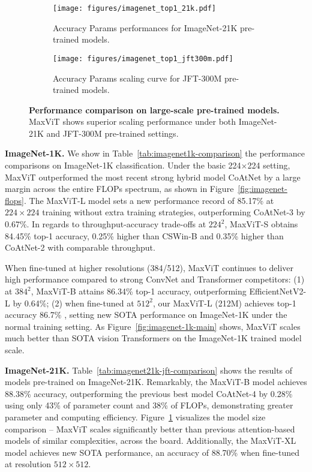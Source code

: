 \documentclass[runningheads]{llncs}
\begin{document}
\begin{figure}[!t]
 \centering
 \begin{subfigure}[b]{0.49\textwidth}
     \centering
     \texttt{[image: figures/imagenet\_top1\_21k.pdf]}
     \caption{Accuracy \vs Params performances for ImageNet-21K pre-trained models.}
     \label{fig:imagenet-21k}
 \end{subfigure}
 \hfill
 \begin{subfigure}[b]{0.49\textwidth}
     \centering
     \texttt{[image: figures/imagenet\_top1\_jft300m.pdf]}
     \caption{Accuracy \vs Params scaling curve for JFT-300M pre-trained models.}
     \label{fig:jft}
 \end{subfigure}
\caption{\textbf{Performance comparison on large-scale pre-trained models.} MaxViT shows superior scaling performance under both ImageNet-21K and JFT-300M pre-trained settings.}
\label{fig:large-scale-data-pt}
\end{figure}


\noindent\textbf{ImageNet-1K.} We show in Table~\ref{tab:imagenet1k-comparison} the performance comparisons on ImageNet-1K classification. Under the basic 224$\times$224 setting, MaxViT outperformed the most recent strong hybrid model CoAtNet by a large margin across the entire FLOPs spectrum, as shown in Figure~\ref{fig:imagenet-flops}. The MaxViT-L model sets a new performance record of 85.17\% at $224\times224$ training without extra training strategies, outperforming CoAtNet-3 by 0.67\%. In regards to throughput-accuracy trade-offs at $224^2$, MaxViT-S obtains 84.45\% top-1 accuracy, 0.25\% higher than CSWin-B and 0.35\% higher than CoAtNet-2 with comparable throughput.

When fine-tuned at higher resolutions (384/512), MaxViT continues to deliver high performance compared to strong ConvNet and Transformer competitors: (1) at $384^2$, MaxViT-B attains 86.34\% top-1 accuracy, outperforming EfficientNetV2-L by 0.64\%; (2) when fine-tuned at $512^2$, our MaxViT-L (212M) achieves top-1 accuracy 86.7\% , setting new SOTA performance on ImageNet-1K under the normal training setting. As Figure~\ref{fig:imagenet-1k-main} shows, MaxViT scales much better than SOTA vision Transformers on the ImageNet-1K trained model scale.


\hspace{-5.5mm}\textbf{ImageNet-21K.} Table~\ref{tab:imagenet21k-jft-comparison} shows the results of models pre-trained on ImageNet-21K. Remarkably, the MaxViT-B model achieves 88.38\% accuracy, outperforming the previous best model CoAtNet-4 by 0.28\% using only 43\% of parameter count and 38\% of FLOPs, demonstrating greater parameter and computing efficiency. Figure~\ref{fig:imagenet-21k} visualizes the model size comparison --  MaxViT scales significantly better than previous attention-based models of similar complexities, across the board. Additionally, the MaxViT-XL model achieves new SOTA performance, an accuracy of 88.70\% when fine-tuned at resolution $512\times512$. 
\end{document}
